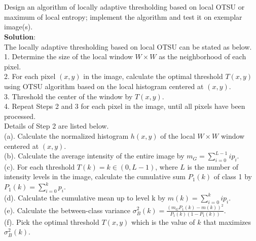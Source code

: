 \documentclass[UTF8]{ctexart}
\begin{document}
\section{}
Design an algorithm of locally adaptive thresholding based on local OTSU or maximum of local entropy; implement the algorithm and test it on exemplar image(s).\\
\textbf{Solution}:\\
The locally adaptive thresholding based on local OTSU can be stated as below.\\
1. Determine the size of the local window $W \times W$ as the neighborhood of each pixel.\\
2. For each pixel $(x,y)$ in the image, calculate the optimal threshold $T(x,y)$ using OTSU algorithm based on the local histogram centered at $(x,y)$.\\
3. Threshold the center of the window by $T(x,y)$.\\
4. Repeat Steps 2 and 3 for each pixel in the image, until all pixels have been processed.\\
Details of Step 2 are listed below.\\
(a). Calculate the normalized histogram $h(x,y)$ of the local $W \times W$ window centered at $(x,y)$.\\
(b). Calculate the average intensity of the entire image by $m_G = \sum\limits_{i=0}^{L-1} i p_i$.\\
(c). For each threshold $T(k)= k \in (0,L-1)$, where $L$ is the number of intensity levels in the image, 
calculate the cumulative sum $P_1(k)$ of class 1 by $P_1(k) = \sum\limits_{i=0}^{k} p_i$.\\
(d). Calculate the cumulative mean up to level k by $m(k) = \sum\limits_{i=0}^{k} i p_i$.\\
(e). Calculate the between-class variance $\sigma_B^2(k) = \frac{(m_GP_1(k)-m(k))^2}{P_1(k)(1-P_1(k))}$.\\
(f). Pick the optimal threshold $T(x,y)$ which is the value of $k$ that maximizes $\sigma_B^2(k)$.\\
\end{document}
